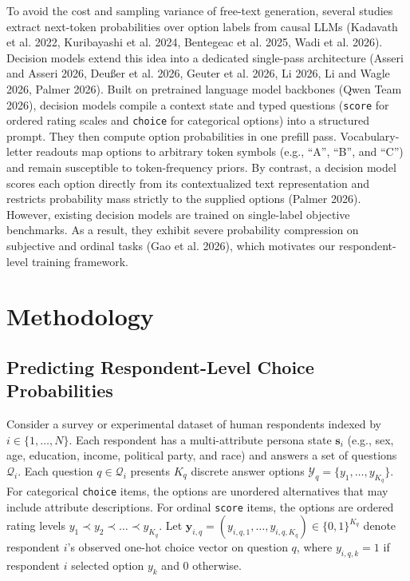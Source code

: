 \documentclass[
  letterpaper,
  DIV=11,
  numbers=noendperiod]{scrartcl}
\begin{document}
To avoid the cost and sampling variance of free-text generation, several
studies extract next-token probabilities over option labels from causal
LLMs ({Kadavath et al.} 2022, Kuribayashi et al. 2024, Bentegeac et al.
2025, Wadi et al. 2026). Decision models extend this idea into a
dedicated single-pass architecture (Asseri and Asseri 2026, Deußer et
al. 2026, Geuter et al. 2026, Li 2026, Li and Wagle 2026, Palmer 2026).
Built on pretrained language model backbones (Qwen Team 2026), decision
models compile a context state and typed questions (\texttt{score} for
ordered rating scales and \texttt{choice} for categorical options) into
a structured prompt. They then compute option probabilities in one
prefill pass. Vocabulary-letter readouts map options to arbitrary token
symbols (e.g., ``A'', ``B'', and ``C'') and remain susceptible to
token-frequency priors. By contrast, a decision model scores each option
directly from its contextualized text representation and restricts
probability mass strictly to the supplied options (Palmer 2026).
However, existing decision models are trained on single-label objective
benchmarks. As a result, they exhibit severe probability compression on
subjective and ordinal tasks (Gao et al. 2026), which motivates our
respondent-level training framework.

\section{Methodology}\label{sec-methodology}

\subsection{Predicting Respondent-Level Choice
Probabilities}\label{predicting-respondent-level-choice-probabilities}

Consider a survey or experimental dataset of human respondents indexed
by \(i \in \{1, \dots, N\}\). Each respondent has a multi-attribute
persona state \(\mathbf{s}_i\) (e.g., sex, age, education, income,
political party, and race) and answers a set of questions
\(\mathcal{Q}_i\). Each question \(q \in \mathcal{Q}_i\) presents
\(K_q\) discrete answer options
\(\mathcal{Y}_q = \{y_1, \dots, y_{K_q}\}\). For categorical
\texttt{choice} items, the options are unordered alternatives that may
include attribute descriptions. For ordinal \texttt{score} items, the
options are ordered rating levels
\(y_1 \prec y_2 \prec \dots \prec y_{K_q}\). Let
\(\mathbf{y}_{i,q} = (y_{i,q,1}, \dots, y_{i,q,K_q}) \in \{0, 1\}^{K_q}\)
denote respondent \(i\)'s observed one-hot choice vector on question
\(q\), where \(y_{i,q,k} = 1\) if respondent \(i\) selected option
\(y_k\) and \(0\) otherwise.
\end{document}
